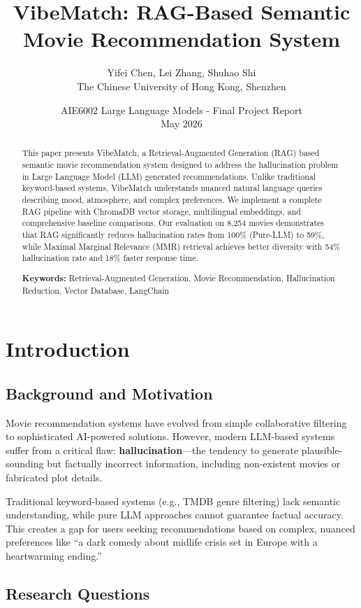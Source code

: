 \documentclass[11pt,a4paper]{article}
\title{\textbf{VibeMatch: RAG-Based Semantic Movie Recommendation System}}
\author{Yifei Chen, Lei Zhang, Shuhao Shi \\
The Chinese University of Hong Kong, Shenzhen}
\date{AIE6002 Large Language Models - Final Project Report\\May 2026}
\begin{document}
\maketitle

\begin{abstract}
This paper presents VibeMatch, a Retrieval-Augmented Generation (RAG) based semantic movie recommendation system designed to address the hallucination problem in Large Language Model (LLM) generated recommendations. Unlike traditional keyword-based systems, VibeMatch understands nuanced natural language queries describing mood, atmosphere, and complex preferences. We implement a complete RAG pipeline with ChromaDB vector storage, multilingual embeddings, and comprehensive baseline comparisons. Our evaluation on 8,254 movies demonstrates that RAG significantly reduces hallucination rates from 100\% (Pure-LLM) to 59\%, while Maximal Marginal Relevance (MMR) retrieval achieves better diversity with 54\% hallucination rate and 18\% faster response time.

\textbf{Keywords:} Retrieval-Augmented Generation, Movie Recommendation, Hallucination Reduction, Vector Database, LangChain
\end{abstract}

\section{Introduction}

\subsection{Background and Motivation}

Movie recommendation systems have evolved from simple collaborative filtering to sophisticated AI-powered solutions. However, modern LLM-based systems suffer from a critical flaw: \textbf{hallucination}---the tendency to generate plausible-sounding but factually incorrect information, including non-existent movies or fabricated plot details.

Traditional keyword-based systems (e.g., TMDB genre filtering) lack semantic understanding, while pure LLM approaches cannot guarantee factual accuracy. This creates a gap for users seeking recommendations based on complex, nuanced preferences like ``a dark comedy about midlife crisis set in Europe with a heartwarming ending.''

\subsection{Research Questions}
\end{document}
